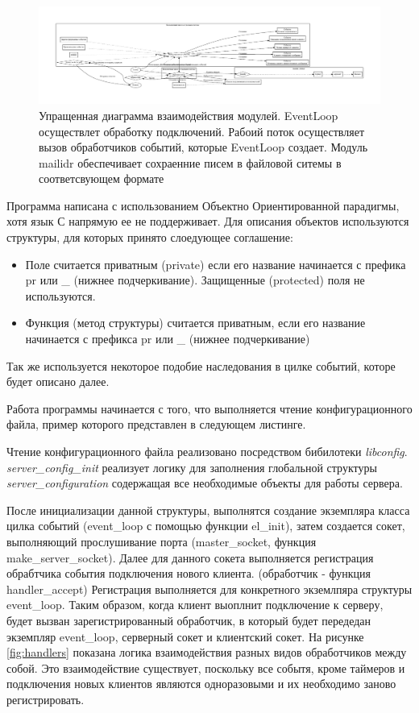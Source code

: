 \documentclass[a4paper,12pt]{report}
\begin{document}
	\begin{figure}[H]
		\centering
		\includegraphics[width=\textwidth]{./resource/logic.pdf}
		\caption{Упращенная диаграмма взаимодействия модулей. EventLoop осуществлет обработку подключений. Рабоий поток осуществляет вызов обработчиков событий, которые EventLoop создает. Модуль mailidr обеспечивает сохраенние писем в файловой ситемы в соответсвующем формате} \label{fig:ProgLogic}
	\end{figure}

	Программа написана с использованием Объектно Ориентированной парадигмы, хотя язык С напрямую ее не поддерживает. Для описания объектов используются структуры, для которых принято слоедующее соглашение:
	\begin{itemize}
		\item Поле считается приватным (private) если его название начинается с префика pr или \_ (нижнее подчеркивание). Защищенные (protected) поля не используются.
		\item Функция (метод структуры) считается приватным, если его название начинается с префикса pr или \_ (нижнее подчеркивание)
	\end{itemize}
	Так же используется некоторое подобие наследования в цилке событий, которе будет описано далее.
	
	Работа программы начинается с того, что выполняется чтение конфигурационного файла, пример которого представлен в следующем листинге. 


	Чтение конфигурационного файла реализовано посредством бибилотеки \textit{libconfig}. \textit{server\_config\_init} реализует логику для заполнения глобальной структуры \textit{server\_configuration} содержащая все необходимые объекты для работы сервера. 

	 После инициализации данной структуры, выполнятся создание экземпляра класса цилка событий (event_loop с помощью функции el\_init), затем создается сокет, выполняющий прослушивание порта (master_socket, функция make\_server\_socket). Далее для данного сокета выполняется регистрация обрабтчика события подключения нового клиента. (обработчик - функция handler\_accept) Регистрация выполняется для конкретного экземлпяра структуры event\_loop. Таким образом, когда клиент выоплнит подключение к серверу, будет вызван зарегистрированный обработчик, в который будет передедан экземпляр event_loop, серверный сокет и клиентский сокет. На рисунке \ref{fig:handlers} показана логика взаимодействия разных видов обработчиков между собой. Это взаимодействие существует, поскольку все событя, кроме таймеров и подключения новых клиентов являются одноразовыми и их необходимо заново регистрировать.
\end{document}
